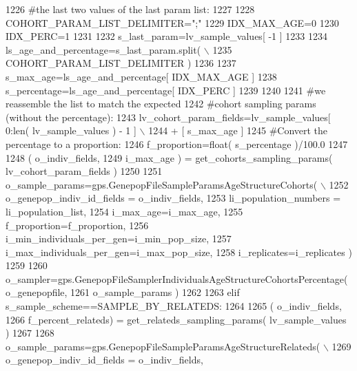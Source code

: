 \begin{DoxyCode}
1226         \textcolor{comment}{#the last two values of the last param list:    }
1227         
1228         COHORT\_PARAM\_LIST\_DELIMITER=\textcolor{stringliteral}{";"}
1229         IDX\_MAX\_AGE=0
1230         IDX\_PERC=1
1231 
1232         s\_last\_param=lv\_sample\_values[ -1 ]
1233 
1234         ls\_age\_and\_percentage=s\_last\_param.split( \(\backslash\)
1235                         COHORT\_PARAM\_LIST\_DELIMITER )
1236 
1237         s\_max\_age=ls\_age\_and\_percentage[ IDX\_MAX\_AGE ]
1238         s\_percentage=ls\_age\_and\_percentage[ IDX\_PERC ]
1239         
1240 
1241         \textcolor{comment}{#we reassemble the list to match the expected}
1242         \textcolor{comment}{#cohort sampling params (without the percentage):}
1243         lv\_cohort\_param\_fields=lv\_sample\_values[ 0:len( lv\_sample\_values ) - 1 ] \(\backslash\)
1244                                                             + [ s\_max\_age ]     
1245         \textcolor{comment}{#Convert the percentage to a proportion:}
1246         f\_proportion=float( s\_percentage )/100.0
1247 
1248         ( o\_indiv\_fields,
1249                 i\_max\_age ) = get\_cohorts\_sampling\_params( lv\_cohort\_param\_fields )
1250 
1251         o\_sample\_params=gps.GenepopFileSampleParamsAgeStructureCohorts( \(\backslash\)
1252                                             o\_genepop\_indiv\_id\_fields = o\_indiv\_fields,
1253                                             li\_population\_numbers = li\_population\_list,
1254                                             i\_max\_age=i\_max\_age,
1255                                             f\_proportion=f\_proportion,
1256                                             i\_min\_individuals\_per\_gen=i\_min\_pop\_size,
1257                                             i\_max\_individuals\_per\_gen=i\_max\_pop\_size,
1258                                             i\_replicates=i\_replicates )
1259 
1260         o\_sampler=gps.GenepopFileSamplerIndividualsAgeStructureCohortsPercentage( o\_genepopfile,
1261                                                                                     o\_sample\_params )
1262                                 
1263     \textcolor{keywordflow}{elif} s\_sample\_scheme==SAMPLE\_BY\_RELATEDS:
1264 
1265             ( o\_indiv\_fields,
1266                 f\_percent\_relateds) = get\_relateds\_sampling\_params( lv\_sample\_values )
1267 
1268             o\_sample\_params=gps.GenepopFileSampleParamsAgeStructureRelateds( \(\backslash\)
1269                                         o\_genepop\_indiv\_id\_fields = o\_indiv\_fields,

\end{DoxyCode}
